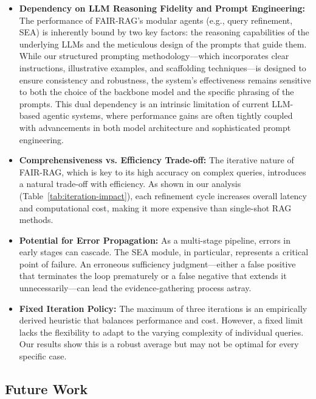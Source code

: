 \documentclass[11pt]{article}
\begin{document}
\begin{itemize}
    \item \textbf{Dependency on LLM Reasoning Fidelity and Prompt Engineering:} The performance of FAIR-RAG's modular agents (e.g., query refinement, SEA) is inherently bound by two key factors: the reasoning capabilities of the underlying LLMs and the meticulous design of the prompts that guide them. While our structured prompting methodology---which incorporates clear instructions, illustrative examples, and scaffolding techniques---is designed to ensure consistency and robustness, the system's effectiveness remains sensitive to both the choice of the backbone model and the specific phrasing of the prompts. This dual dependency is an intrinsic limitation of current LLM-based agentic systems, where performance gains are often tightly coupled with advancements in both model architecture and sophisticated prompt engineering.
    
    \item \textbf{Comprehensiveness vs. Efficiency Trade-off:} The iterative nature of FAIR-RAG, which is key to its high accuracy on complex queries, introduces a natural trade-off with efficiency. As shown in our analysis (Table~\ref{tab:iteration-impact}), each refinement cycle increases overall latency and computational cost, making it more expensive than single-shot RAG methods.
    
    \item \textbf{Potential for Error Propagation:} As a multi-stage pipeline, errors in early stages can cascade. The SEA module, in particular, represents a critical point of failure. An erroneous sufficiency judgment---either a false positive that terminates the loop prematurely or a false negative that extends it unnecessarily---can lead the evidence-gathering process astray.
    
    \item \textbf{Fixed Iteration Policy:} The maximum of three iterations is an empirically derived heuristic that balances performance and cost. However, a fixed limit lacks the flexibility to adapt to the varying complexity of individual queries. Our results show this is a robust average but may not be optimal for every specific case.
\end{itemize}

\subsection{Future Work}
\end{document}
